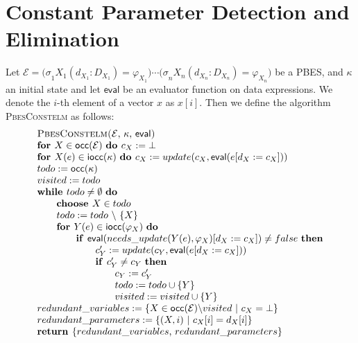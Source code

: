 \documentclass{article}
\begin{document}
\newpage

\section{Constant Parameter Detection and Elimination}

Let $\mathcal{E=(\sigma }_{1}X_{1}(d_{X_{1}}:D_{X_{1}})=\varphi
_{X_{1}})\cdots \mathcal{(\sigma }_{n}X_{n}(d_{X_{n}}:D_{X_{n}})=\varphi
_{X_{n}})$ be a PBES, and $\kappa $ an initial state and let $\mathsf{eval}$
be an evaluator function on data expressions. We denote the $i$-th element
of a vector $x$ as $x[i]$. Then we define the algorithm \textsc{PbesConstelm}
as follows:$\qquad \qquad $%
\begin{equation*}
\begin{array}{l}
\text{\textsc{PbesConstelm(}}\mathcal{E}\text{, }\kappa \text{, }\mathsf{eval%
}\text{\textsc{)}} \\
\text{\textbf{for }}X\in \mathsf{occ}(\mathcal{E)}\text{ \textbf{do }}%
c_{X}:=\bot  \\
\text{\textbf{for }}X(e)\in \mathsf{iocc}(\kappa \mathcal{)}\text{ \textbf{%
do }}c_{X}:=update(c_{X},\mathsf{eval}(e[d_{X}:=c_{X}])) \\
todo:=\mathsf{occ}(\kappa \mathcal{)} \\
visited:=todo \\
\text{\textbf{while }}todo\neq \emptyset \text{ \textbf{do}} \\
\qquad \text{\textbf{choose }}X\in todo \\
\qquad todo:=todo\ \backslash \ \{X\} \\
\qquad \text{\textbf{for }}Y(e)\in \mathsf{iocc}(\varphi _{X}\mathcal{)}%
\text{ \textbf{do}} \\
\qquad \qquad \text{\textbf{if }}\mathsf{eval}(needs\_update(Y(e),\varphi
_{X})[d_{X}:=c_{X}])\neq false\text{ \textbf{then}} \\
\qquad \qquad \qquad c_{Y}^{\prime }:=update(c_{Y},\mathsf{eval}%
(e[d_{X}:=c_{X}])) \\
\qquad \qquad \qquad \text{\textbf{if }}c_{Y}^{\prime }\neq c_{Y}\text{
\textbf{then}} \\
\qquad \qquad \qquad \qquad c_{Y}:=c_{Y}^{\prime } \\
\qquad \qquad \qquad \qquad todo:=todo\cup \{Y\} \\
\qquad \qquad \qquad \qquad visited:=visited\cup \{Y\} \\
redundant\_variables:=\{X\in \mathsf{occ}(\mathcal{E)\setminus }visited\ |\
c_{X}=\bot \} \\
redundant\_parameters:=\{(X,i)\ |\ c_{X}[i]=d_{X}[i]\} \\
\text{\textbf{return }}\{redundant\_variables\text{, }redundant\_parameters\}%
\end{array}%
\end{equation*}
\end{document}
